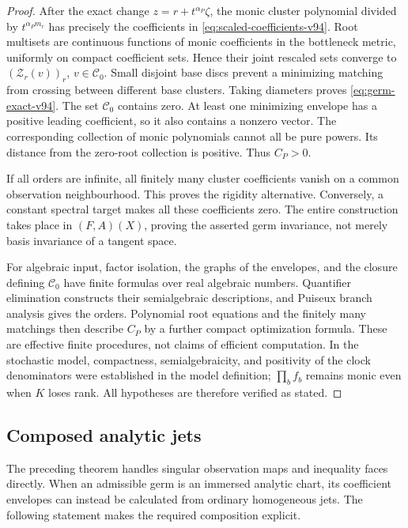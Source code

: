 \begin{proof}
After the exact change $z=r+t^{\alpha_P}\zeta$, the monic cluster
polynomial divided by $t^{\alpha_Pm_r}$ has precisely the
coefficients in \eqref{eq:scaled-coefficients-v94}. Root multisets
are continuous functions of monic coefficients in the bottleneck
metric, uniformly on compact coefficient sets. Hence their joint
rescaled sets converge to $(\mathcal Z_r(v))_r$, $v\in\mathcal C_0$.
Small disjoint base discs prevent a minimizing matching from crossing
between different base clusters. Taking diameters proves
\eqref{eq:germ-exact-v94}. The set $\mathcal C_0$ contains zero.
At least one minimizing envelope has a positive leading coefficient,
so it also contains a nonzero vector. The corresponding collection
of monic polynomials cannot all be pure powers. Its distance from
the zero-root collection is positive. Thus $C_P>0$.

If all orders are infinite, all finitely many cluster coefficients
vanish on a common observation neighbourhood. This proves the
rigidity alternative. Conversely, a constant spectral target makes
all these coefficients zero. The entire construction takes place
in $(F,A)(X)$, proving the asserted germ invariance, not merely basis
invariance of a tangent space.

For algebraic input, factor isolation, the graphs of the envelopes,
and the closure defining $\mathcal C_0$ have finite formulas over
real algebraic numbers. Quantifier elimination constructs their
semialgebraic descriptions, and Puiseux branch analysis gives the
orders. Polynomial root equations and the finitely many matchings
then describe $C_P$ by a further compact optimization formula.
These are effective finite procedures, not claims of efficient
computation. In the stochastic model, compactness, semialgebraicity,
and positivity of the clock denominators were established in the
model definition; $\prod_bf_b$ remains monic even when $K$ loses
rank. All hypotheses are therefore verified as stated.
\end{proof}

\subsection{Composed analytic jets}
The preceding theorem handles singular observation maps and inequality
faces directly. When an admissible germ is an immersed analytic chart,
its coefficient envelopes can instead be calculated from ordinary
homogeneous jets. The following statement makes the required
composition explicit.

